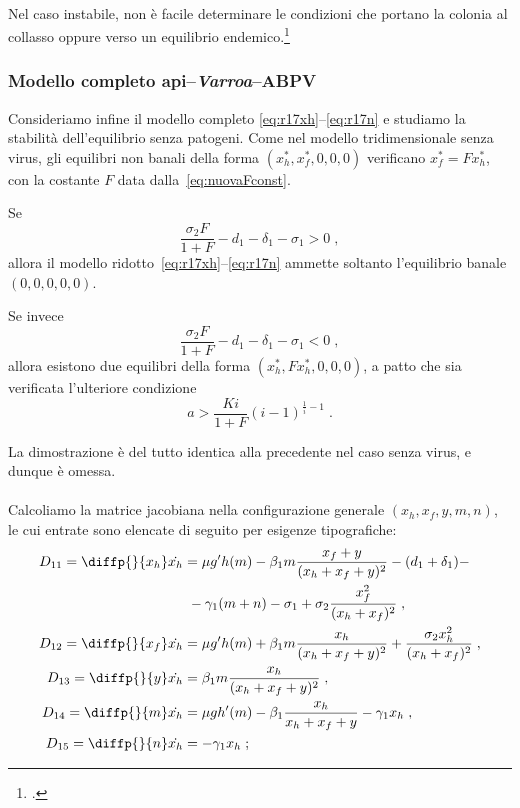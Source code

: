 \paragraph{}
Nel caso instabile, non è facile determinare le condizioni che portano la colonia al collasso oppure
verso un equilibrio endemico.\footcite[15]{ratti2017}


\subsubsection{Modello completo api--\emph{Varroa}--ABPV}
Consideriamo infine il modello completo \eqref{eq:r17xh}--\eqref{eq:r17n} e studiamo la stabilità
dell'equilibrio senza patogeni.
Come nel modello tridimensionale senza virus, gli equilibri non banali della
forma $(x_h^*, x_f^*, 0,0,0)$ verificano $x_f^* = F x_h^*$, con
la costante $F$ data dalla~\eqref{eq:nuovaFconst}.

\begin{proposizione}
Se
$$\frac{\sigma_2 F}{1+F} - d_1 -\delta_1 -\sigma_1 > 0 \; ,$$
allora il modello ridotto~\eqref{eq:r17xh}--\eqref{eq:r17n} ammette
soltanto l'equilibrio banale $(0,0,0,0,0)$.

Se invece
$$\frac{\sigma_2 F}{1+F} - d_1 -\delta_1 -\sigma_1 < 0 \; ,$$
allora esistono due equilibri della forma $(x_h^*, F x_h^*, 0, 0, 0)$,
a patto che sia verificata l'ulteriore condizione
$$a > \frac{Ki}{1+F} {(i-1)}^{\frac{1}{i} -1} \; .$$
\end{proposizione}

La dimostrazione è del tutto identica alla precedente nel caso senza virus, e dunque è omessa.

\paragraph{}
Calcoliamo la matrice jacobiana nella configurazione generale $(x_h, x_f, y, m, n)$,
le cui entrate sono elencate di seguito per esigenze tipografiche:
\begin{equation}
\begin{split} %
D_{11} = \diffp{}{{x_h}} \dot{x_h} &=
    \mu g' h(m) - \beta_1 m \frac{x_f + y}{(x_h+x_f+y)^2} - (d_1 +\delta_1) - \\
    &~ - \gamma_1 (m+n) - \sigma_1 + \sigma_2 \frac{x_f^2}{(x_h+x_f)^2} \; , \\
D_{12} = \diffp{}{{x_f}} \dot{x_h} &= \mu g' h(m) + \beta_1 m \frac{x_h}{(x_h+x_f+y)^2} +
    \frac{\sigma_2 x_h^2}{(x_h+x_f)^2} \; , \\
D_{13} = \diffp{}{{y}} \dot{x_h} &= \beta_1 m \frac{x_h}{(x_h+x_f+y)^2} \; , \\
D_{14} = \diffp{}{m} \dot{x_h} &= \mu g h'(m) - \beta_1 \frac{x_h}{x_h+x_f+y} - \gamma_1 x_h \; , \\
D_{15} = \diffp{}{n} \dot{x_h} &= -\gamma_1 x_h \; ;
\end{split}
\end{equation}

